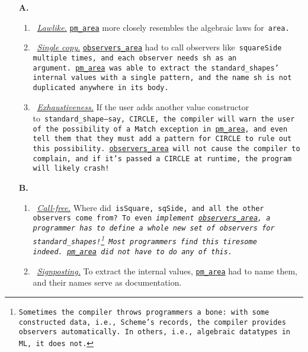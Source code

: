\documentclass[manuscript,screen 12pt, nonacm]{acmart}
\begin{document}
    \begin{enumerate}
      \item [\textbf{A.}]
      \begin{enumerate}[label=\arabic*]
        \item~\hyperref[p1]{\it{Lawlike.}}
        \hyperref[fig:pmarea]{\tt{pm\_area}} more closely resembles the
        algebraic laws for~\tt{area}. 
        \item~\hyperref[p2]{\it{Single copy.}}
        \hyperref[fig:observersarea]{\tt{observers\_area}} had to call observers
        like~\tt{squareSide} multiple times, and each observer needs~\tt{sh} as
        an argument.~\hyperref[fig:pmarea]{\tt{pm\_area}} was able to extract
        the~\tt{standard\_shape}s' internal values with a single pattern, and
        the name~\tt{sh} is not duplicated anywhere in its body. 
        \item~\hyperref[p5]{\it{Exhaustiveness.}} 
        If the user adds another value
        constructor to~\tt{standard\_shape}---say,~\tt{CIRCLE}, the compiler
        will warn the user of the possibility of a~\tt{Match} exception in
        \hyperref[fig:pmarea]{\tt{pm\_area}}, and even tell them that they must
        add a pattern for~\tt{CIRCLE} to rule out this possibility.
        \hyperref[fig:observersarea]{\tt{observers\_area}} will not cause the
        compiler to complain, and if it's passed a~\tt{CIRCLE} at runtime, the
        program will likely crash! 
    \end{enumerate}
      
    \item [\textbf{B.}]
      \begin{enumerate}[start=4, label=\arabic*]
        \item~\hyperref[p3]{\it{Call-free.}} Where did~\tt{isSquare},
        \tt{sqSide}, and all the other observers come from? To even
        \it{implement}~\hyperref[fig:observersarea]{\tt{observers\_area}}, a
        programmer has to define a whole new set of observers for
        \tt{standard\_shape}s!\footnote{Sometimes the compiler throws
        programmers a bone: with some constructed data, i.e., Scheme's records,
        the compiler provides observers automatically. In others, i.e.,
        algebraic datatypes in ML, it does not.} Most programmers find this
        tiresome indeed.~\hyperref[fig:pmarea]{\tt{pm\_area}} did not have to do
        any of this.
        \item~\hyperref[p4]{\it{Signposting.}} 
        To extract the internal values,
        \hyperref[fig:pmarea]{\tt{pm\_area}} had to name them, and their names
        serve as documentation. 
      \end{enumerate}
    \end{enumerate}
\end{document}
